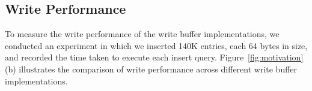 

\subsection{Write Performance}

To measure the write performance of the write buffer implementations, we
conducted an experiment in which we inserted 140K entries, each 64 bytes in
size, and recorded the time taken to execute each insert query.
Figure~\ref{fig:motivation} (b) illustrates the comparison of write
performance across different write buffer implementations.

